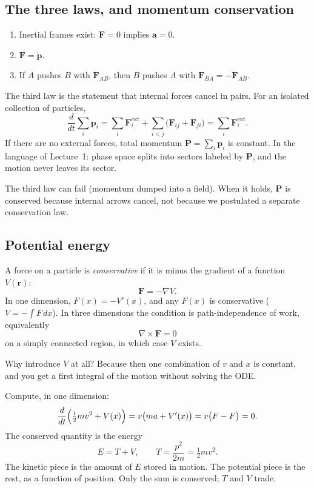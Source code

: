 \documentclass[11pt]{article}
\numberwithin{equation}{section}
\newcommand{\ddt}{\frac{d}{dt}}
\newcommand{\vect}[1]{\mathbf{#1}}
\begin{document}
\subsection{The three laws, and momentum conservation}

\begin{enumerate}[leftmargin=1.4em]
\item Inertial frames exist: $\vect{F}=0$ implies $\vect{a}=0$.
\item $\vect{F}=\dot{\vect{p}}$.
\item If $A$ pushes $B$ with $\vect{F}_{AB}$, then $B$ pushes $A$ with $\vect{F}_{BA}=-\vect{F}_{AB}$.
\end{enumerate}

The third law is the statement that internal forces cancel in pairs. For an isolated collection of particles,
\[
\ddt\sum_i \vect{p}_i
= \sum_i \vect{F}_i^{\mathrm{ext}}
+ \sum_{i<j}\bigl(\vect{F}_{ij}+\vect{F}_{ji}\bigr)
= \sum_i \vect{F}_i^{\mathrm{ext}}.
\]
If there are no external forces, total momentum $\vect{P}=\sum_i\vect{p}_i$ is constant. In the language of Lecture~1: phase space splits into sectors labeled by $\vect{P}$, and the motion never leaves its sector.

The third law can fail (momentum dumped into a field). When it holds, $\vect{P}$ is conserved because internal arrows cancel, not because we postulated a separate conservation law.

\subsection{Potential energy}

A force on a particle is \emph{conservative} if it is minus the gradient of a function $V(\vect{r})$:
\[
\vect{F} = -\nabla V.
\]
In one dimension, $F(x)=-V'(x)$, and any $F(x)$ is conservative ($V=-\int F\,dx$). In three dimensions the condition is path-independence of work, equivalently
\[
\nabla\times\vect{F}=0
\]
on a simply connected region, in which case $V$ exists.

Why introduce $V$ at all? Because then one combination of $v$ and $x$ is constant, and you get a first integral of the motion without solving the ODE.

Compute, in one dimension:
\[
\ddt\Bigl(\tfrac12 m v^2 + V(x)\Bigr)
= v\bigl(m a + V'(x)\bigr)
= v\bigl(F - F\bigr)
= 0.
\]
The conserved quantity is the energy
\[
E = T + V,\qquad T = \frac{p^2}{2m} = \tfrac12 m v^2.
\]
The kinetic piece is the amount of $E$ stored in motion. The potential piece is the rest, as a function of position. Only the sum is conserved; $T$ and $V$ trade.
\end{document}
